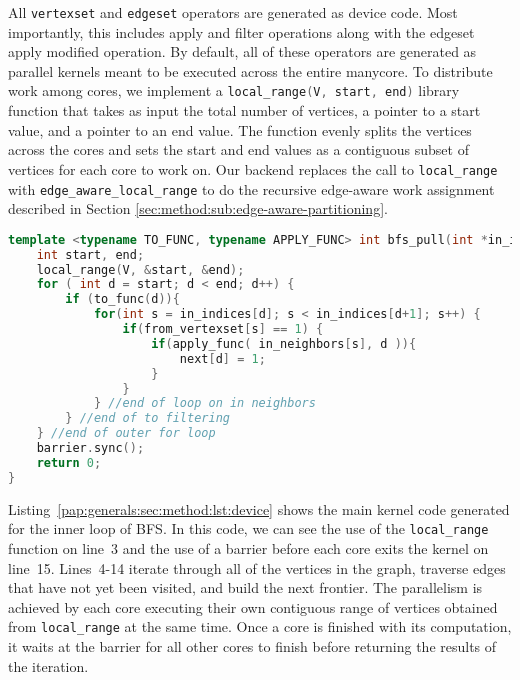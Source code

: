All \lstinline[language=graphit]{vertexset} and  \lstinline[language=graphit]{edgeset} operators are generated as device code. Most importantly, this includes apply and filter operations along with the edgeset apply modified operation. 
By default, all of these operators are generated as parallel kernels meant to be executed across the entire manycore. 
To distribute work among cores, we implement a \lstinline[language=C++, basicstyle=\small\ttfamily]{local_range(V, start, end)} library function that takes as input the total number of vertices, a pointer to a start value, and a pointer to an end value.
The function evenly splits the vertices across the cores and sets the start and end values as a contiguous subset of vertices for each core to work on. 
Our backend replaces the call to \lstinline[language=C++, basicstyle=\small\ttfamily]{local_range} with \lstinline[language=C++, basicstyle=\small\ttfamily]{edge_aware_local_range} to do the recursive edge-aware work assignment described in Section \ref{sec:method:sub:edge-aware-partitioning}.
\newline
\begin{lstlisting}[language=C++, breaklines=true, 
                   caption=Generated manycore device code for the Breadth-First Search (BFS) program shown in Listing~\ref{pap:generals2020:sec:background:lst:graphit}.,
                   label=pap:generals:sec:method:lst:device]
template <typename TO_FUNC, typename APPLY_FUNC> int bfs_pull(int *in_indices , int *in_neighbors, int *from_vertexset, TO_FUNC to_func, APPLY_FUNC apply_func) { 
    int start, end;
    local_range(V, &start, &end);
    for ( int d = start; d < end; d++) {
        if (to_func(d)){ 
            for(int s = in_indices[d]; s < in_indices[d+1]; s++) {
                if(from_vertexset[s] == 1) {
                    if(apply_func( in_neighbors[s], d )){ 
                        next[d] = 1; 
                    }
                }
            } //end of loop on in neighbors
        } //end of to filtering
    } //end of outer for loop
    barrier.sync();
    return 0;
}
\end{lstlisting}

Listing~\ref{pap:generals:sec:method:lst:device} shows the main kernel code generated for the inner loop of BFS. 
In this code, we can see the use of the \lstinline[language=C++, basicstyle=\small\ttfamily]{local_range} function on line~3 and the use of a barrier before each core exits the kernel on line~15. 
Lines~4-14 iterate through all of the vertices in the graph, traverse edges that have not yet been visited, and build the next frontier.
The parallelism is achieved by each core executing their own contiguous range of vertices obtained from \lstinline[language=C++, basicstyle=\small\ttfamily]{local_range} at the same time. Once a core is finished with its computation, it waits at the barrier for all other cores to finish before returning the results of the iteration. 

